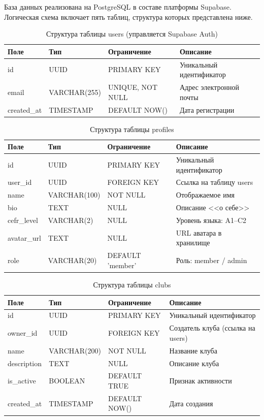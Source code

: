 База данных реализована на PostgreSQL в составе платформы Supabase. Логическая
схема включает пять таблиц, структура которых представлена ниже.

\begin{table}[h]
\centering
\caption{Структура таблицы users (управляется Supabase Auth)}
\label{tab:users}
\begin{tabular}{|p{3cm}|p{3.5cm}|p{3.5cm}|p{3.5cm}|}
\hline
\textbf{Поле} & \textbf{Тип} & \textbf{Ограничение} & \textbf{Описание} \\
\hline
id & UUID & PRIMARY KEY & Уникальный идентификатор \\
\hline
email & VARCHAR(255) & UNIQUE, NOT NULL & Адрес электронной почты \\
\hline
created\_at & TIMESTAMP & DEFAULT NOW() & Дата регистрации \\
\hline
\end{tabular}
\end{table}

\begin{table}[h]
\centering
\caption{Структура таблицы profiles}
\label{tab:profiles}
\begin{tabular}{|p{3cm}|p{3.5cm}|p{3.5cm}|p{3.5cm}|}
\hline
\textbf{Поле} & \textbf{Тип} & \textbf{Ограничение} & \textbf{Описание} \\
\hline
id & UUID & PRIMARY KEY & Уникальный идентификатор \\
\hline
user\_id & UUID & FOREIGN KEY & Ссылка на таблицу users \\
\hline
name & VARCHAR(100) & NOT NULL & Отображаемое имя \\
\hline
bio & TEXT & NULL & Описание <<о себе>> \\
\hline
cefr\_level & VARCHAR(2) & NULL & Уровень языка: A1--C2 \\
\hline
avatar\_url & TEXT & NULL & URL аватара в хранилище \\
\hline
role & VARCHAR(20) & DEFAULT 'member' & Роль: member / admin \\
\hline
\end{tabular}
\end{table}

\begin{table}[h]
\centering
\caption{Структура таблицы clubs}
\label{tab:clubs}
\begin{tabular}{|p{3cm}|p{3.5cm}|p{3.5cm}|p{3.5cm}|}
\hline
\textbf{Поле} & \textbf{Тип} & \textbf{Ограничение} & \textbf{Описание} \\
\hline
id & UUID & PRIMARY KEY & Уникальный идентификатор \\
\hline
owner\_id & UUID & FOREIGN KEY & Создатель клуба (ссылка на users) \\
\hline
name & VARCHAR(200) & NOT NULL & Название клуба \\
\hline
description & TEXT & NULL & Описание клуба \\
\hline
is\_active & BOOLEAN & DEFAULT TRUE & Признак активности \\
\hline
created\_at & TIMESTAMP & DEFAULT NOW() & Дата создания \\
\hline
\end{tabular}
\end{table}

